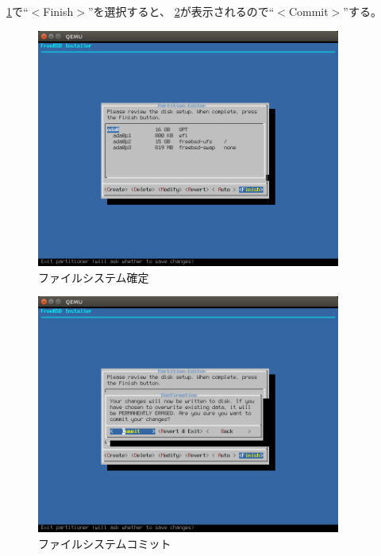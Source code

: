 \documentclass[a4j]{jarticle}
\begin{document}
\ref{fig:FreeBSD_FileSYstem_fin}で``$<$Finish$>$''を選択すると、
\ref{fig:FreeBSD_FileSYstem_com}が表示されるので``$<$Commit$>$''する。
\begin{figure}[htbp]
	\begin{center}
    	\includegraphics[width=10cm]{./IMG/FreeBSD_PT_FIX.png}
	\end{center}
    \caption{ファイルシステム確定}
    \label{fig:FreeBSD_FileSYstem_fin}
\end{figure}
\begin{figure}[htbp]
	\begin{center}
    	\includegraphics[width=10cm]{./IMG/FreeBSD_COMMIT.png}
	\end{center}
    \caption{ファイルシステムコミット}
    \label{fig:FreeBSD_FileSYstem_com}
\end{figure}
\end{document}
